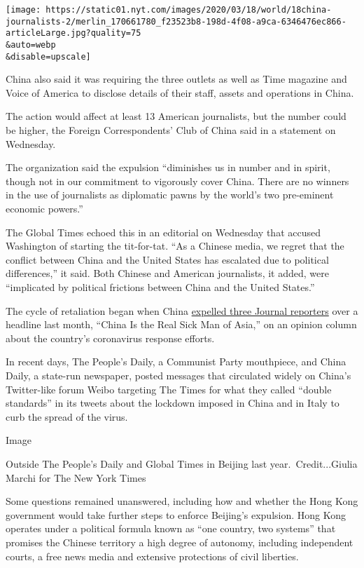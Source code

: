 \texttt{[image: https://static01.nyt.com/images/2020/03/18/world/18china-journalists-2/merlin\_170661780\_f23523b8-198d-4f08-a9ca-6346476ec866-articleLarge.jpg?quality=75\\\&auto=webp\\\&disable=upscale]}

China also said it was requiring the three outlets as well as Time
magazine and Voice of America to disclose details of their staff, assets
and operations in China.

The action would affect at least 13 American journalists, but the number
could be higher, the Foreign Correspondents' Club of China said in a
statement on Wednesday.

The organization said the expulsion ``diminishes us in number and in
spirit, though not in our commitment to vigorously cover China. There
are no winners in the use of journalists as diplomatic pawns by the
world's two pre-eminent economic powers.''

The Global Times echoed this in an editorial on Wednesday that accused
Washington of starting the tit-for-tat. ``As a Chinese media, we regret
that the conflict between China and the United States has escalated due
to political differences,'' it said. Both Chinese and American
journalists, it added, were ``implicated by political frictions between
China and the United States.''

The cycle of retaliation began when China
\href{https://www.nytimes.com/2020/02/19/business/media/china-wall-street-journal.html}{expelled
three Journal reporters} over a headline last month, ``China Is the Real
Sick Man of Asia,'' on an opinion column about the country's coronavirus
response efforts.

In recent days, The People's Daily, a Communist Party mouthpiece, and
China Daily, a state-run newspaper, posted messages that circulated
widely on China's Twitter-like forum Weibo targeting The Times for what
they called ``double standards'' in its tweets about the lockdown
imposed in China and in Italy to curb the spread of the virus.

Image

Outside The People's Daily and Global Times in Beijing last
year.~Credit...Giulia Marchi for The New York Times

Some questions remained unanswered, including how and whether the Hong
Kong government would take further steps to enforce Beijing's expulsion.
Hong Kong operates under a political formula known as ``one country, two
systems'' that promises the Chinese territory a high degree of autonomy,
including independent courts, a free news media and extensive
protections of civil liberties.

